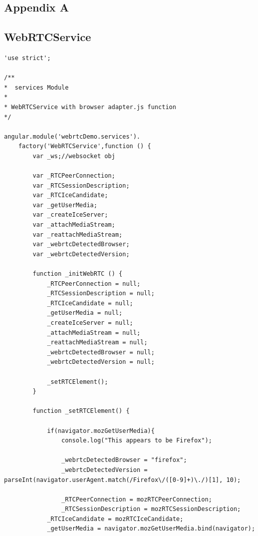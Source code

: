 \appendix
{}
 \renewcommand{\chaptername}{\appendixname}
 
\begin{appendices}

\chapter{Appendix A}

\section{WebRTCService} \label{app:webrtc_service}

\begin{lstlisting}[caption={WebRTCService in application client},label={code:webrtc_service}]
'use strict';

/**
*  services Module
*
* WebRTCService with browser adapter.js function
*/

angular.module('webrtcDemo.services').
	factory('WebRTCService',function () {
		var _ws;//websocket obj
		
		var _RTCPeerConnection;
		var _RTCSessionDescription;
		var _RTCIceCandidate;
		var _getUserMedia;
		var _createIceServer;
		var _attachMediaStream;
		var _reattachMediaStream;
		var _webrtcDetectedBrowser;
		var _webrtcDetectedVersion;

		function _initWebRTC () {
			_RTCPeerConnection = null;
			_RTCSessionDescription = null;
			_RTCIceCandidate = null;
			_getUserMedia = null;
			_createIceServer = null;
			_attachMediaStream = null;
			_reattachMediaStream = null;
			_webrtcDetectedBrowser = null;
			_webrtcDetectedVersion = null;

			_setRTCElement();
		}

		function _setRTCElement() {

			if(navigator.mozGetUserMedia){
				console.log("This appears to be Firefox");

				_webrtcDetectedBrowser = "firefox";
				_webrtcDetectedVersion = parseInt(navigator.userAgent.match(/Firefox\/([0-9]+)\./)[1], 10);

				_RTCPeerConnection = mozRTCPeerConnection;
				_RTCSessionDescription = mozRTCSessionDescription;
  			_RTCIceCandidate = mozRTCIceCandidate;
  			_getUserMedia = navigator.mozGetUserMedia.bind(navigator);


\end{lstlisting}
\end{appendices}
